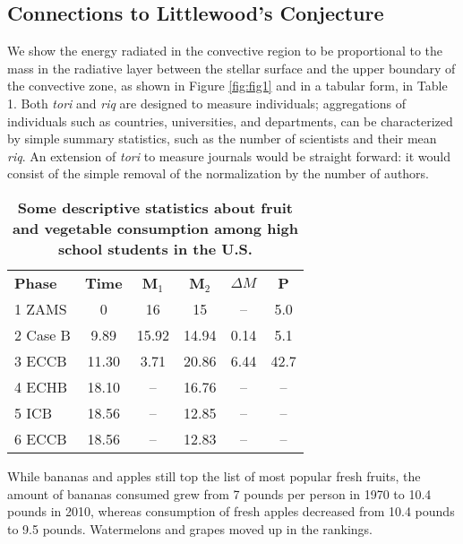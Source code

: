 \subsection{Connections to Littlewood's Conjecture}

We show the energy radiated in the convective region to be proportional to the mass in the radiative layer between the stellar surface and the upper boundary of the convective zone, as shown in Figure \ref{fig:fig1} and in a tabular form, in Table 1. Both {\it tori} and {\it riq} are designed to measure individuals; aggregations of individuals such as countries, universities, and departments, can be characterized by simple summary statistics, such as the number of scientists and their mean {\it riq}. An extension of {\it tori} to measure journals would be straight forward: it would consist of the simple removal of the normalization by the number of authors.  

\begin{table}
\begin{center}
\begin{tabular}{lccccc}
\hline
\textbf{Phase}        & \textbf{Time} & \textbf{M$_1$}  & \textbf{M$_2$} &  \textbf{$\Delta M$} & \textbf{P} \\   
1 ZAMS           & 0      & 16     & 15    & --   & 5.0   \\            
2 Case B       & 9.89   & 15.92  & 14.94 & 0.14 & 5.1   \\
3 ECCB        & 11.30  &  3.71  & 20.86 & 6.44 & 42.7  \\
4 ECHB      & 18.10  & --     & 16.76 &  --  & --    \\
5 ICB       & 18.56  & --     & 12.85 &  --  & --    \\    
6 ECCB      & 18.56  & --     & 12.83 &  --  & --    \\
\hline
\end{tabular}
\end{center}
\caption{\textbf{Some descriptive statistics about fruit and vegetable consumption among high school students in the U.S.}}
\end{table}

While bananas and apples still top the list of most popular fresh fruits, the amount of bananas consumed grew from 7 pounds per person in 1970 to 10.4 pounds in 2010, whereas consumption of fresh apples decreased from 10.4 pounds to 9.5 pounds. Watermelons and grapes moved up in the rankings.

  
